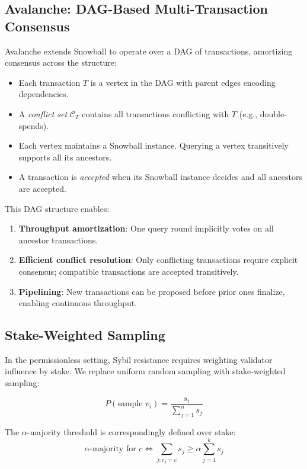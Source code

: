 \subsection{Avalanche: DAG-Based Multi-Transaction Consensus}

Avalanche extends Snowball to operate over a DAG of transactions, amortizing consensus across the structure:

\begin{itemize}
    \item Each transaction $T$ is a vertex in the DAG with parent edges encoding dependencies.
    \item A \emph{conflict set} $\mathcal{C}_T$ contains all transactions conflicting with $T$ (e.g., double-spends).
    \item Each vertex maintains a Snowball instance. Querying a vertex transitively supports all its ancestors.
    \item A transaction is \emph{accepted} when its Snowball instance decides and all ancestors are accepted.
\end{itemize}

This DAG structure enables:
\begin{enumerate}
    \item \textbf{Throughput amortization}: One query round implicitly votes on all ancestor transactions.
    \item \textbf{Efficient conflict resolution}: Only conflicting transactions require explicit consensus; compatible transactions are accepted transitively.
    \item \textbf{Pipelining}: New transactions can be proposed before prior ones finalize, enabling continuous throughput.
\end{enumerate}

\subsection{Stake-Weighted Sampling}

In the permissionless setting, Sybil resistance requires weighting validator influence by stake. We replace uniform random sampling with stake-weighted sampling:

\begin{equation}
    P(\text{sample } v_i) = \frac{s_i}{\sum_{j=1}^{n} s_j}
\end{equation}

The $\alpha$-majority threshold is correspondingly defined over stake:
\begin{equation}
    \alpha\text{-majority for } c \iff \sum_{j: c_j = c} s_j \geq \alpha \sum_{j=1}^{k} s_j
\end{equation}

